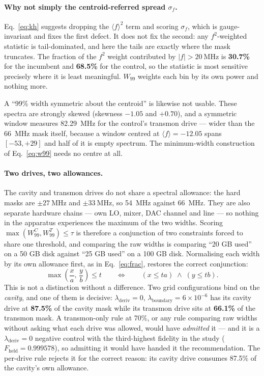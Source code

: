 \documentclass[11pt]{article}
\newcommand{\lamd}{\lambda_{\mathrm{deriv}}}
\newcommand{\lamb}{\lambda_{\mathrm{boundary}}}
\begin{document}
\paragraph{Why not simply the centroid-referred spread $\sigma_f$.}
Eq.~\eqref{eq:kh} suggests dropping the $\langle f\rangle^2$ term and scoring $\sigma_f$, which is
gauge-invariant and fixes the first defect. It does not fix the second: any $f^2$-weighted
statistic is tail-dominated, and here the tails are exactly where the mask truncates. The fraction
of the $f^2$ weight contributed by $|f| > \SI{20}{\mega\hertz}$ is \textbf{30.7\%} for the
incumbent and \textbf{68.5\%} for the control, so the statistic is most sensitive precisely where
it is least meaningful. $W_{99}$ weights each bin by its own power and nothing more.

A ``99\% width symmetric about the centroid'' is likewise not usable. These spectra are strongly
skewed (skewness $-1.05$ and $+0.70$), and a symmetric window measures \SI{82.29}{\mega\hertz} for
the control's transmon drive --- wider than the \SI{66}{\mega\hertz} mask itself, because a window
centred at $\langle f\rangle = -12.05$ spans $[-53, +29]$ and half of it is empty spectrum. The
minimum-width construction of Eq.~\eqref{eq:w99} needs no centre at all.

\paragraph{Two drives, two allowances.}
The cavity and transmon drives do not share a spectral allowance: the hard masks are
$\pm\SI{27}{\mega\hertz}$ and $\pm\SI{33}{\mega\hertz}$, so \SI{54}{\mega\hertz} against
\SI{66}{\mega\hertz}. They are also separate hardware chains --- own LO, mixer, DAC channel and
line --- so nothing in the apparatus experiences the maximum of the two widths. Scoring
$\max(W_{99}^{C}, W_{99}^{T}) \leq \tau$ is therefore a conjunction of two constraints forced to
share one threshold, and comparing the raw widths is comparing ``20 GB used'' on a 50 GB disk
against ``25 GB used'' on a 100 GB disk.
Normalising each width by its own allowance first, as in Eq.~\eqref{eq:frac}, restores the correct
conjunction:
%
\begin{equation}
\label{eq:conj}
\max\!\left(\frac{x}{a},\, \frac{y}{b}\right) \leq t
\qquad\Longleftrightarrow\qquad
(x \leq ta) \;\wedge\; (y \leq tb).
\end{equation}
%
This is not a distinction without a difference. Two grid configurations bind on the
\emph{cavity}, and one of them is decisive: $\lamd = 0$, $\lamb = 6\times10^{-6}$ has its cavity
drive at \textbf{87.5\%} of the cavity mask while its transmon drive sits at \textbf{66.1\%} of
the transmon mask. A transmon-only rule at 70\%, or any rule comparing raw widths without asking
what each drive was allowed, would have \emph{admitted} it --- and it is a $\lamd = 0$ negative
control with the third-highest fidelity in the study ($F_{\mathrm{held}} = \num{0.999578}$), so
admitting it would have handed it the recommendation. The per-drive rule rejects it for the
correct reason: its cavity drive consumes 87.5\% of the cavity's own allowance.
\end{document}
